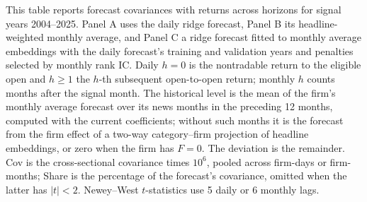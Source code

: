 \begin{table}[htbp]
\centering
\caption{Forecast Covariance with Returns across Horizons}
\label{tab:tab7}
\begin{minipage}{\linewidth}\footnotesize
This table reports forecast covariances with returns across horizons for signal years 2004--2025. Panel A uses the daily ridge forecast, Panel B its headline-weighted monthly average, and Panel C a ridge forecast fitted to monthly average embeddings with the daily forecast's training and validation years and penalties selected by monthly rank IC. Daily $h=0$ is the nontradable return to the eligible open and $h\ge1$ the $h$-th subsequent open-to-open return; monthly $h$ counts months after the signal month. The historical level is the mean of the firm's monthly average forecast over its news months in the preceding 12 months, computed with the current coefficients; without such months it is the forecast from the firm effect of a two-way category--firm projection of headline embeddings, or zero when the firm has $F=0$. The deviation is the remainder. Cov is the cross-sectional covariance times $10^6$, pooled across firm-days or firm-months; Share is the percentage of the forecast's covariance, omitted when the latter has $|t|<2$. Newey--West $t$-statistics use 5 daily or 6 monthly lags.
\end{minipage}
\medskip


\end{table}
